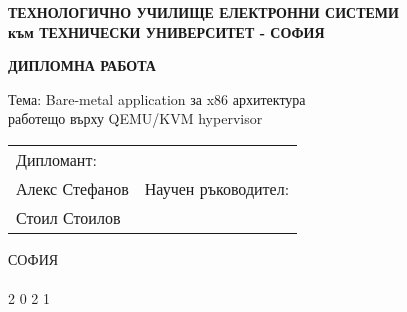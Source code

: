\thispagestyle{empty} %
\begin{center}
  \textbf{
    ТЕХНОЛОГИЧНО УЧИЛИЩЕ ЕЛЕКТРОННИ СИСТЕМИ \\
    към ТЕХНИЧЕСКИ УНИВЕРСИТЕТ - СОФИЯ \\
  }

  \vspace{70mm}
  \textbf{\huge ДИПЛОМНА РАБОТА \\ }

  \vspace{20mm}
  {\Large Тема:
    Bare-metal application за x86 архитектура \\
    работещо върху QEMU/KVM hypervisor
  }

  \vspace{35mm}
  \begin{tabular}{p{8cm}p{8cm}}
    \centering
    Дипломант: \\
    Алекс Стефанов
    &
    \centering
    Научен ръководител: \\
    Стоил Стоилов
  \end{tabular}

  \vfill
  СОФИЯ \\
  \hfill \\
  2 0 2 1 \\
\end{center}
\newpage
